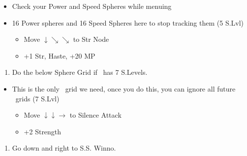 \begin{spheregrid}
    \begin{itemize}
        \item Check your Power and Speed Spheres while menuing
        \item 16 Power spheres and 16 Speed Spheres here to stop tracking them
        \tidusf (5 S.Lvl)
        \begin{itemize}
            \item Move $\downarrow \searrow\searrow$ to Str Node
            \item +1 Str, Haste, +20 MP
        \end{itemize}
    \end{itemize}
\end{spheregrid}
\begin{enumerate}[resume]
    \item Do the below Sphere Grid if \wakka\ has 7 S.Levels.
\end{enumerate}
\begin{spheregrid}
    \begin{itemize}
        \item This is the only \wakka\ grid we need, once you do this, you can ignore all future \wakka\ grids
        \wakkaf (7 S.Lvl)
        \begin{itemize}
            \item Move $\downarrow\downarrow\rightarrow$ to Silence Attack
            \item +2 Strength
        \end{itemize}
    \end{itemize}
\end{spheregrid}
\begin{enumerate}[resume]
    \item Go down and right to S.S. Winno.
\end{enumerate}
